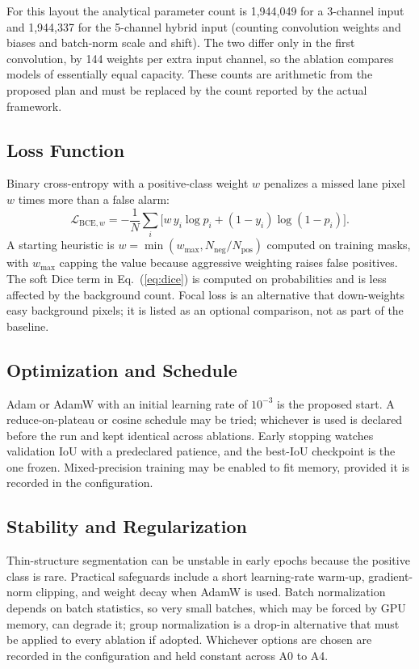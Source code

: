 \documentclass[10pt,a4paper,twocolumn]{article}
\begin{document}
For this layout the analytical parameter count is 1,944,049 for a 3-channel input and 1,944,337 for the 5-channel hybrid input (counting convolution weights and biases and batch-norm scale and shift). The two differ only in the first convolution, by 144 weights per extra input channel, so the ablation compares models of essentially equal capacity. These counts are arithmetic from the proposed plan and must be replaced by the count reported by the actual framework.

\subsection{Loss Function}
Binary cross-entropy with a positive-class weight $w$ penalizes a missed lane pixel $w$ times more than a false alarm:
\begin{equation}
\mathcal{L}_{\mathrm{BCE},w} = -\frac{1}{N}\sum_i\big[w\,y_i\log p_i+(1-y_i)\log(1-p_i)\big].
\end{equation}
A starting heuristic is $w=\min(w_{\max},N_{\mathrm{neg}}/N_{\mathrm{pos}})$ computed on training masks, with $w_{\max}$ capping the value because aggressive weighting raises false positives. The soft Dice term in Eq.~(\ref{eq:dice}) is computed on probabilities and is less affected by the background count. Focal loss \cite{lin2017} is an alternative that down-weights easy background pixels; it is listed as an optional comparison, not as part of the baseline.

\subsection{Optimization and Schedule}
Adam or AdamW with an initial learning rate of $10^{-3}$ is the proposed start. A reduce-on-plateau or cosine schedule may be tried; whichever is used is declared before the run and kept identical across ablations. Early stopping watches validation IoU with a predeclared patience, and the best-IoU checkpoint is the one frozen. Mixed-precision training may be enabled to fit memory, provided it is recorded in the configuration.

\subsection{Stability and Regularization}
Thin-structure segmentation can be unstable in early epochs because the positive class is rare. Practical safeguards include a short learning-rate warm-up, gradient-norm clipping, and weight decay when AdamW is used. Batch normalization depends on batch statistics, so very small batches, which may be forced by GPU memory, can degrade it; group normalization is a drop-in alternative that must be applied to every ablation if adopted. Whichever options are chosen are recorded in the configuration and held constant across A0 to A4.
\end{document}
